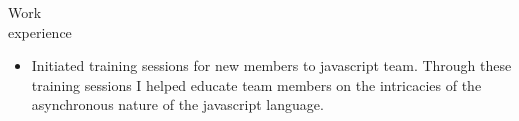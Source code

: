\begin{category}{Work \\experience}
\begin{itemize}



\item Initiated training sessions for new members to javascript team. Through these training sessions I helped educate team members on the intricacies of the asynchronous nature of the javascript language.%




\end{itemize}
\end{category}
